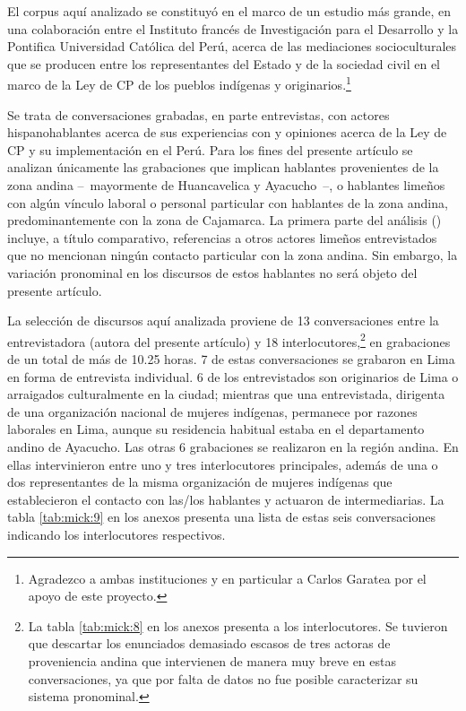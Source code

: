 \documentclass[output=paper]{../langscibook}
\begin{document}
El corpus aquí analizado se constituyó en el marco de un estudio más grande, en una colaboración entre el Instituto francés de Investigación para el Desarrollo y la Pontifica Universidad Católica del Perú, acerca de las mediaciones socioculturales que se producen entre los representantes del Estado y de la sociedad civil en el marco de la Ley de CP de los pueblos indígenas y originarios.\footnote{Agradezco a ambas instituciones y en particular a Carlos Garatea por el apoyo de este proyecto.} 

Se trata de conversaciones grabadas, en parte entrevistas, con actores hispanohablantes acerca de sus experiencias con y opiniones acerca de la Ley de CP y su implementación en el Perú. Para los fines del presente artículo se analizan únicamente las grabaciones que implican hablantes provenientes de la zona andina -- mayormente de Huancavelica y Ayacucho --, o hablantes limeños con algún vínculo laboral o personal particular con hablantes de la zona andina, predominantemente con la zona de Cajamarca. La primera parte del análisis () incluye, a título comparativo, referencias a otros actores limeños entrevistados que no mencionan ningún contacto particular con la zona andina. Sin embargo, la variación pronominal en los discursos de estos hablantes no será objeto del presente artículo.

La selección de discursos aquí analizada proviene de 13 conversaciones entre la entrevistadora (autora del presente artículo) y 18 interlocutores,\footnote{La tabla \ref{tab:mick:8} en los anexos presenta a los interlocutores. Se tuvieron que descartar los enunciados demasiado escasos de tres actoras de proveniencia andina que intervienen de manera muy breve en estas conversaciones, ya que por falta de datos no fue posible caracterizar su sistema pronominal.} en grabaciones de un total de más de 10.25 horas. 7 de estas conversaciones se grabaron en Lima en forma de entrevista individual. 6 de los entrevistados son originarios de Lima o arraigados culturalmente en la ciudad; mientras que una entrevistada, dirigenta de una organización nacional de mujeres indígenas, permanece por razones laborales en Lima, aunque su residencia habitual estaba en el departamento andino de Ayacucho. Las otras 6 grabaciones se realizaron en la región andina. En ellas intervinieron entre uno y tres interlocutores principales, además de una o dos representantes de la misma organización de mujeres indígenas que establecieron el contacto con las/los hablantes y actuaron de intermediarias. La tabla \ref{tab:mick:9} en los anexos presenta una lista de estas seis conversaciones indicando los interlocutores respectivos.
\end{document}
